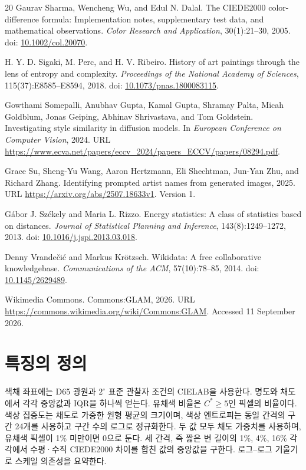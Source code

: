 \documentclass[11pt,a4paper]{article}
\begin{document}
\begin{thebibliography}{20}
Gaurav Sharma, Wencheng Wu, and Edul N. Dalal.
The CIEDE2000 color-difference formula: Implementation notes, supplementary test data, and mathematical observations.
\textit{Color Research and Application}, 30(1):21--30, 2005.
doi: \href{https://doi.org/10.1002/col.20070}{10.1002/col.20070}.

H. Y. D. Sigaki, M. Perc, and H. V. Ribeiro.
History of art paintings through the lens of entropy and complexity.
\textit{Proceedings of the National Academy of Sciences}, 115(37):E8585--E8594, 2018.
doi: \href{https://doi.org/10.1073/pnas.1800083115}{10.1073/pnas.1800083115}.

Gowthami Somepalli, Anubhav Gupta, Kamal Gupta, Shramay Palta, Micah Goldblum, Jonas Geiping, Abhinav Shrivastava, and Tom Goldstein.
Investigating style similarity in diffusion models.
In \textit{European Conference on Computer Vision}, 2024.
URL \url{https://www.ecva.net/papers/eccv_2024/papers_ECCV/papers/08294.pdf}.

Grace Su, Sheng-Yu Wang, Aaron Hertzmann, Eli Shechtman, Jun-Yan Zhu, and Richard Zhang.
Identifying prompted artist names from generated images, 2025.
URL \url{https://arxiv.org/abs/2507.18633v1}. Version 1.

Gábor J. Székely and Maria L. Rizzo.
Energy statistics: A class of statistics based on distances.
\textit{Journal of Statistical Planning and Inference}, 143(8):1249--1272, 2013.
doi: \href{https://doi.org/10.1016/j.jspi.2013.03.018}{10.1016/j.jspi.2013.03.018}.

Denny Vrandečić and Markus Krötzsch.
Wikidata: A free collaborative knowledgebase.
\textit{Communications of the ACM}, 57(10):78--85, 2014.
doi: \href{https://doi.org/10.1145/2629489}{10.1145/2629489}.

Wikimedia Commons.
Commons:GLAM, 2026.
URL \url{https://commons.wikimedia.org/wiki/Commons:GLAM}.
Accessed 11 September 2026.
\end{thebibliography}
\endgroup
\clearpage

\appendix
\section{특징의 정의}\label{app:features}
색채 좌표에는 D65 광원과 $2^\circ$ 표준 관찰자 조건의 CIELAB을 사용한다. 명도와 채도에서 각각 중앙값과 IQR을 하나씩 얻는다. 유채색 비율은 $C^*\geq5$인 픽셀의 비율이다. 색상 집중도는 채도로 가중한 원형 평균의 크기이며, 색상 엔트로피는 동일 간격의 구간 24개를 사용하고 구간 수의 로그로 정규화한다. 두 값 모두 채도 가중치를 사용하며, 유채색 픽셀이 1\% 미만이면 0으로 둔다. 세 간격, 즉 짧은 변 길이의 1\%, 4\%, 16\% 각각에서 수평·수직 CIEDE2000 차이를 합친 값의 중앙값을 구한다. 로그--로그 기울기로 스케일 의존성을 요약한다\citep{sharma2005ciede}.
\end{document}
